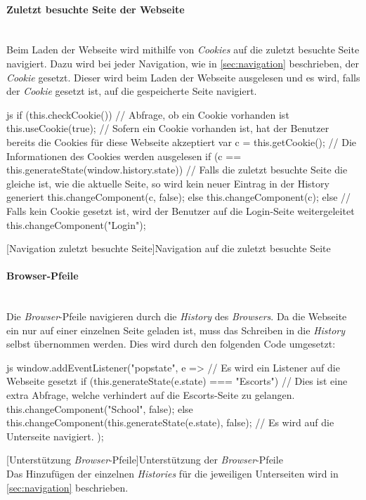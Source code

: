 \paragraph{Zuletzt besuchte Seite der Webseite}~\\
Beim Laden der Webseite wird mithilfe von \textit{Cookies} auf die zuletzt besuchte Seite navigiert. Dazu wird bei jeder Navigation, wie in \autoref{sec:navigation} beschrieben, der \textit{Cookie} gesetzt. Dieser wird beim Laden der Webseite ausgelesen und es wird, falls der \textit{Cookie} gesetzt ist, auf die gespeicherte Seite navigiert.
\begin{code}{js}
	if (this.checkCookie()) {		// Abfrage, ob ein Cookie vorhanden ist
		this.useCookie(true);		// Sofern ein Cookie vorhanden ist, hat der Benutzer bereits die Cookies für diese Webseite akzeptiert
		var c = this.getCookie();	// Die Informationen des Cookies werden ausgelesen
		if (c == this.generateState(window.history.state)) {	// Falls die zuletzt besuchte Seite die gleiche ist, wie die aktuelle Seite, so wird kein neuer Eintrag in der History generiert
			this.changeComponent(c, false);
		} else {
			this.changeComponent(c);
		}
	} else {
		// Falls kein Cookie gesetzt ist, wird der Benutzer auf die Login-Seite weitergeleitet
		this.changeComponent("Login");
	}
\end{code}
[Navigation zuletzt besuchte Seite]{Navigation auf die zuletzt besuchte Seite}~\\

\paragraph{Browser-Pfeile}~\\
Die \textit{Browser}-Pfeile navigieren durch die \textit{History} des \textit{Browsers}. Da die Webseite ein nur auf einer einzelnen Seite geladen ist, muss das Schreiben in die \textit{History} selbst übernommen werden. Dies wird durch den folgenden Code umgesetzt:
\begin{code}{js}
window.addEventListener("popstate", e => {			// Es wird ein Listener auf die Webseite gesetzt
	if (this.generateState(e.state) === "Escorts") {	// Dies ist eine extra Abfrage, welche verhindert auf die Escorts-Seite zu gelangen.
		this.changeComponent("School", false);
	} else {
		this.changeComponent(this.generateState(e.state), false);	// Es wird auf die Unterseite navigiert.
	}
});
\end{code}
[Unterstützung \textit{Browser}-Pfeile]{Unterstützung der \textit{Browser}-Pfeile}~\\
Das Hinzufügen der einzelnen \textit{Histories} für die jeweiligen Unterseiten wird in \autoref{sec:navigation} beschrieben.
\newpage
